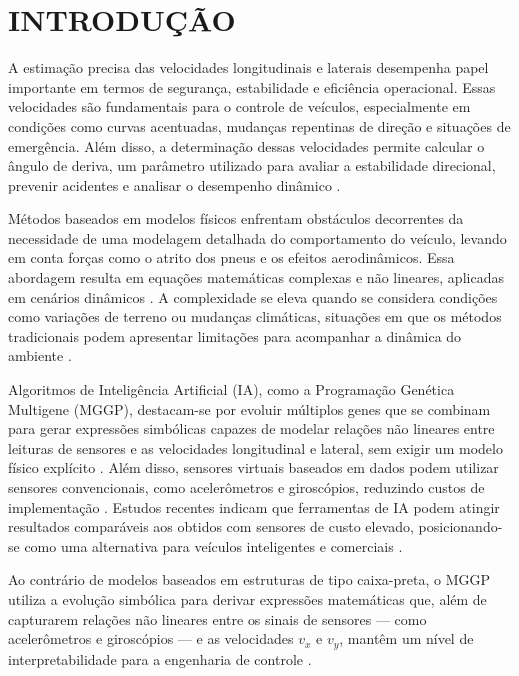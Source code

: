 \chapter{INTRODUÇÃO}\label{sec:introducao}

A estimação precisa das velocidades longitudinais e laterais desempenha papel importante em termos de segurança, estabilidade e eficiência operacional. Essas velocidades são fundamentais para o controle de veículos, especialmente em condições como curvas acentuadas, mudanças repentinas de direção e situações de emergência. Além disso, a determinação dessas velocidades permite calcular o ângulo de deriva, um parâmetro utilizado para avaliar a estabilidade direcional, prevenir acidentes e analisar o desempenho dinâmico \cite{wang2023}.

Métodos baseados em modelos físicos enfrentam obstáculos decorrentes da necessidade de uma modelagem detalhada do comportamento do veículo, levando em conta forças como o atrito dos pneus e os efeitos aerodinâmicos. Essa abordagem resulta em equações matemáticas complexas e não lineares, aplicadas em cenários dinâmicos \cite{singh2018}. A complexidade se eleva quando se considera condições como variações de terreno ou mudanças climáticas, situações em que os métodos tradicionais podem apresentar limitações para acompanhar a dinâmica do ambiente \cite{viehweger2020}.

Algoritmos de Inteligência Artificial (IA), como a Programação Genética Multigene (MGGP), destacam-se por evoluir múltiplos genes que se combinam para gerar expressões simbólicas capazes de modelar relações não lineares entre leituras de sensores e as velocidades longitudinal e lateral, sem exigir um modelo físico explícito \cite{mota2022}. Além disso, sensores virtuais baseados em dados podem utilizar sensores convencionais, como acelerômetros e giroscópios, reduzindo custos de implementação \cite{kong2022}. Estudos recentes indicam que ferramentas de IA podem atingir resultados comparáveis aos obtidos com sensores de custo elevado, posicionando-se como uma alternativa para veículos inteligentes e comerciais \cite{jin2021}.

Ao contrário de modelos baseados em estruturas de tipo caixa-preta, o MGGP utiliza a evolução simbólica para derivar expressões matemáticas que, além de capturarem relações não lineares entre os sinais de sensores --- como acelerômetros e giroscópios --- e as velocidades $v_x$ e $v_y$, mantêm um nível de interpretabilidade para a engenharia de controle \cite{olson2010, castro2023}.

